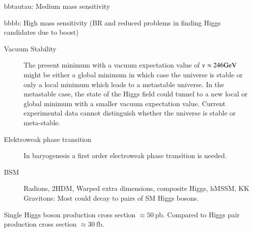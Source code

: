bbtautau: Medium mass sensitivity

bbbb: High mass sensitivity (BR and reduced problems in finding Higgs
candidates due to boost)


\begin{description}


\item[Vacuum Stability] The present minimum with a vacuum expectation
  value of $v \approx \si{246}{\ensuremath{\text{GeV}}}$ might be either a global minimum
  in which case the universe is stable or only a local minimum which
  leads to a metastable universe. In the metastable case, the state of
  the Higgs field could tunnel to a new local or global minimum with a
  smaller vacuum expectation value. Current experimental data cannot
  distinguish whether the universe is stable or
  meta-stable.

\item[Elektroweak phase transition] In baryogenesis a first order
  electroweak phase transition is needed.

\item[BSM] Radions, 2HDM, Warped extra dimensions, composite Higgs,
  hMSSM, KK Gravitons: Most could decay to pairs of SM Higgs bosons.

\end{description}

Single Higgs boson production cross section
$\approx \SI{50}{\pico\barn}$. Compared to Higgs pair production cross
section $\approx \SI{30}{\femto\barn}$.






